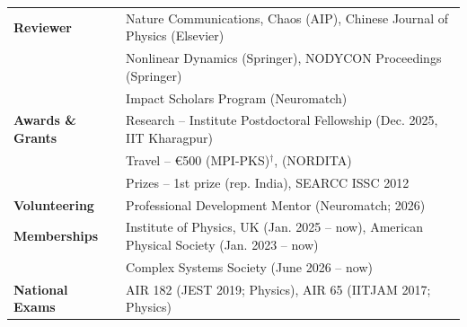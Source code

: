 
\begin{longtable}[l]{@{} m{3.75cm} m{15cm}}

\textbf{Reviewer} & Nature Communications, Chaos (AIP), Chinese Journal of Physics (Elsevier)\\
                            & Nonlinear Dynamics (Springer), NODYCON Proceedings (Springer)\\
                            & Impact Scholars Program (Neuromatch)\\[0.15cm]

\textbf{Awards \& Grants} & \textcolor{mygray2}{Research} -- Institute Postdoctoral Fellowship (Dec. 2025, IIT Kharagpur) \\ 
                                    &\textcolor{mygray2}{Travel} -- \euro{500} (MPI-PKS)$^\dagger$, \textdollar 600 (NORDITA)\\
                                    & \textcolor{mygray2}{Prizes} -- 1st prize (rep. India), SEARCC ISSC 2012\\[0.15cm]

\textbf{Volunteering} 
& Professional Development Mentor (Neuromatch; 2026)\\[0.15cm] 

\textbf{Memberships} & Institute of Physics, UK (Jan. 2025 -- now), American Physical Society (Jan. 2023 -- now)\\
& Complex Systems Society (June 2026 -- now)\\[0.15cm]

\textbf{National Exams} & AIR 182 (JEST 2019; Physics), AIR 65 (IITJAM 2017; Physics)\\
\end{longtable}